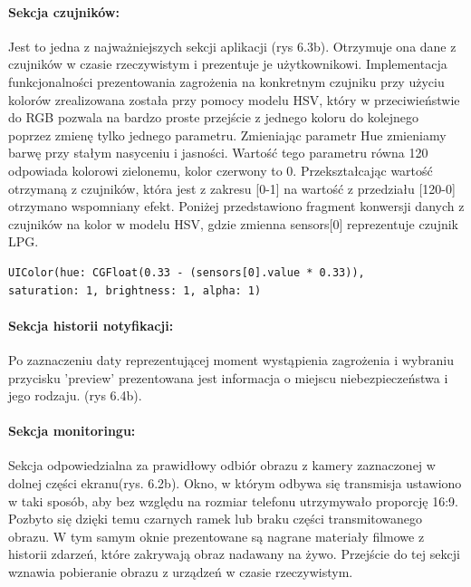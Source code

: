 \paragraph{Sekcja czujników:}
Jest to jedna z najważniejszych sekcji aplikacji (rys 6.3b).  Otrzymuje ona dane z czujników w czasie rzeczywistym i prezentuje je użytkownikowi. Implementacja funkcjonalności prezentowania zagrożenia na konkretnym czujniku przy użyciu kolorów zrealizowana została przy pomocy modelu HSV, który w przeciwieństwie do RGB pozwala na bardzo proste przejście z jednego koloru do kolejnego poprzez zmienę tylko jednego parametru. Zmieniając parametr Hue zmieniamy barwę przy stałym nasyceniu i jasności. Wartość tego parametru równa 120\textdegree{} odpowiada kolorowi zielonemu, kolor czerwony to 0\textdegree{}. Przekształcając wartość otrzymaną z czujników, która jest z zakresu [0-1] na wartość z przedziału [120-0] otrzymano wspomniany efekt. 
Poniżej przedstawiono fragment konwersji danych z czujników na kolor w modelu HSV, gdzie zmienna sensors[0] reprezentuje czujnik LPG.
\begin{verbatim}
UIColor(hue: CGFloat(0.33 - (sensors[0].value * 0.33)),
saturation: 1, brightness: 1, alpha: 1)
\end{verbatim}


\paragraph{Sekcja historii notyfikacji:}
Po zaznaczeniu daty reprezentującej moment wystąpienia zagrożenia i wybraniu przycisku 'preview' prezentowana jest informacja o miejscu niebezpieczeństwa i jego rodzaju. (rys 6.4b).


\paragraph{Sekcja monitoringu:}
Sekcja odpowiedzialna za prawidłowy odbiór obrazu z kamery zaznaczonej w dolnej części ekranu(rys. 6.2b). Okno, w którym odbywa się transmisja ustawiono w taki sposób, aby bez względu na rozmiar telefonu utrzymywało proporcję 16:9. Pozbyto się dzięki temu czarnych ramek lub braku części transmitowanego obrazu. W tym samym oknie prezentowane są nagrane materiały filmowe z historii zdarzeń, które zakrywają obraz nadawany na żywo. Przejście do tej sekcji wznawia pobieranie obrazu z urządzeń w czasie rzeczywistym.


